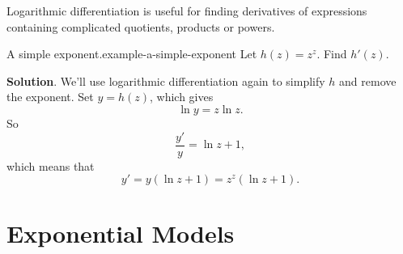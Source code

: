 \documentclass[10pt,]{book}
\numberwithin{equation}{section}
\begin{document}
\hypertarget{p-243}{}%
Logarithmic differentiation is useful for finding derivatives of expressions containing complicated quotients, products or powers.%
\begin{example}{A simple exponent.}{example-a-simple-exponent}%
\hypertarget{p-244}{}%
Let \(h(z) = z^{z}\). Find \(h'(z)\).%
\par\smallskip%
\noindent\textbf{Solution}.\hypertarget{solution-53}{}\quad%
\hypertarget{p-245}{}%
We'll use logarithmic differentiation again to simplify \(h\) and remove the exponent. Set \(y = h(z)\), which gives%
\begin{equation*}
\ln y = z\ln z.
\end{equation*}
So%
\begin{equation*}
\frac{y'}{y} = \ln z + 1,
\end{equation*}
which means that%
\begin{equation*}
y' = y(\ln z + 1) = z^{z}(\ln z + 1).
\end{equation*}
%
\end{example}
%
%
\typeout{************************************************}
\typeout{************************************************}
%
\section[{Exponential Models}]{Exponential Models}\label{section-exponential-models}
%
%
\typeout{************************************************}
\typeout{************************************************}
%
\end{document}
